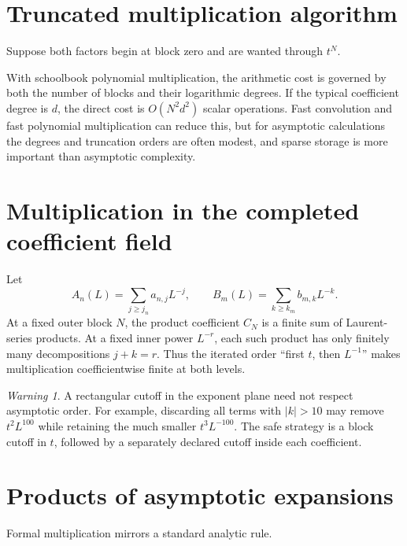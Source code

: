 \documentclass[11pt,oneside]{book}
\theoremstyle{definition}
\theoremstyle{remark}
\newtheorem{warning}[theorem]{Warning}
\begin{document}
\section{Truncated multiplication algorithm}
Suppose both factors begin at block zero and are wanted through $t^N$.

\begin{algorithm}[H]
\caption{Truncated polynomial--logarithmic product}
\label{alg:pl-product}
\;
\end{algorithm}

With schoolbook polynomial multiplication, the arithmetic cost is governed by
both the number of blocks and their logarithmic degrees.  If the typical
coefficient degree is $d$, the direct cost is $O(N^2d^2)$ scalar operations.
Fast convolution and fast polynomial multiplication can reduce this, but for
asymptotic calculations the degrees and truncation orders are often modest,
and sparse storage is more important than asymptotic complexity.

\section{Multiplication in the completed coefficient field}
Let
\[
 A_n(L)=\sum_{j\ge j_n}a_{n,j}L^{-j},
 \qquad
 B_m(L)=\sum_{k\ge k_m}b_{m,k}L^{-k}.
\]
At a fixed outer block $N$, the product coefficient $C_N$ is a finite sum of
Laurent-series products.  At a fixed inner power $L^{-r}$, each such product
has only finitely many decompositions $j+k=r$.  Thus the iterated order
``first $t$, then $L^{-1}$'' makes multiplication coefficientwise finite at
both levels.

\begin{warning}
A rectangular cutoff in the exponent plane need not respect asymptotic order.
For example, discarding all terms with $|k|>10$ may remove $t^2L^{100}$ while
retaining the much smaller $t^3L^{-100}$.  The safe strategy is a block cutoff
in $t$, followed by a separately declared cutoff inside each coefficient.
\end{warning}

\section{Products of asymptotic expansions}
Formal multiplication mirrors a standard analytic rule.
\end{document}
